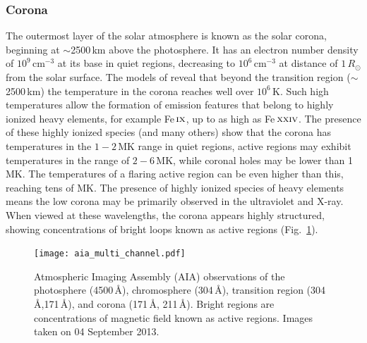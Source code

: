 \subsubsection{Corona}\label{sec:123}

The outermost layer of the solar atmosphere is known as the solar corona, beginning at $\sim$2500\,km above the photosphere. It has an electron number density of $10^{9}$\,cm$^{-3}$ at its base in quiet regions, decreasing to $10^{6}$\,cm$^{-3}$ at distance of $1\,R_{\odot}$ from the solar surface. The models of \citet{vernazza1981, fontenla1988, gabriel1976} reveal that beyond the transition region ($\sim$2500\,km) the temperature in the corona reaches well over $10^{6}$\,K. Such high temperatures allow the formation of emission features that belong to highly ionized heavy elements, for example Fe\,$\textsc{ix}$, up to as high as Fe\,$\textsc{xxiv}$. The presence of these highly ionized species (and many others) show that the corona has temperatures in the $1-2$\,MK range in quiet regions, active regions may exhibit temperatures in the range of $2-6$\,MK, while coronal holes may be lower than 1\,MK. The temperatures of a flaring active region can be even higher than this, reaching tens of MK. The presence of highly ionized species of heavy elements means the low corona may be primarily observed in the ultraviolet and X-ray. When viewed at these wavelengths, the corona appears highly structured, showing concentrations of bright loops known as active regions (Fig.~\ref{fig:aia_corona}).
\begin{figure}[!t]
\begin{center}
\texttt{[image: aia\_multi\_channel.pdf]}
\caption[AIA image of the corona]{Atmospheric Imaging Assembly (AIA) observations of the photosphere (4500\,\AA), chromosphere (304\,\AA), transition region (304\,\AA,171\,\AA), and corona (171\,\AA, 211\,\AA). Bright regions are concentrations of magnetic field known as active regions. Images taken on 04 September 2013.}
\label{fig:aia_corona} 
\end{center}
\end{figure}

